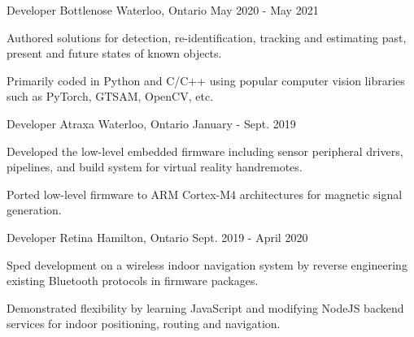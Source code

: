
\begin{cventries}

  \cventry
    {Developer} %
    {Bottlenose} %
    {Waterloo, Ontario} %
    {May 2020 - May 2021} %
    {
      \begin{cvitems} %
        \item {Authored solutions for detection, re-identification, tracking and estimating past, present and future states of known objects.}
        \item {Primarily coded in Python and C/C++ using popular computer vision libraries such as PyTorch, GTSAM, OpenCV, etc.}
      \end{cvitems}
    }

  \cventry
    {Developer} %
    {Atraxa} %
    {Waterloo, Ontario} %
    {January - Sept. 2019} %
    {
      \begin{cvitems} %
        \item {Developed the low-level embedded firmware including sensor peripheral drivers, pipelines, and build system for virtual reality handremotes.}
        \item {Ported low-level firmware to ARM Cortex-M4 architectures for magnetic signal generation.}
      \end{cvitems}
    }

  \cventry
    {Developer} %
    {Retina} %
    {Hamilton, Ontario} %
    {Sept. 2019 - April 2020} %
    {
      \begin{cvitems} %
        \item {Sped development on a wireless indoor navigation system by reverse engineering existing Bluetooth protocols in firmware packages.}
        \item {Demonstrated flexibility by learning JavaScript and modifying NodeJS backend services for indoor positioning, routing and navigation.}
      \end{cvitems}
    }


\end{cventries}
